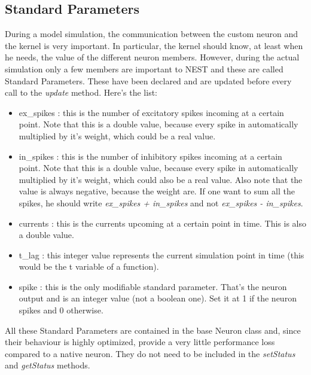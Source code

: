 \documentclass{article}
\begin{document}
\subsection{Standard Parameters}
During a model simulation, the communication between the custom neuron and the kernel is very important. In particular, the kernel should know, at least when he needs, the value of the different neuron members. However, during the actual simulation only a few members are important to NEST and these are called Standard Parameters.
These have been declared and are updated before every call to the \emph{update} method. Here's the list:
\begin{itemize}
\item ex\_spikes : this is the number of excitatory spikes incoming at a certain point. Note that this is a double value, because every spike in automatically multiplied by it's weight, which could be a real value.
\item in\_spikes : this is the number of inhibitory spikes incoming at a certain point. Note that this is a double value, because every spike in automatically multiplied by it's weight, which could also be a real value. Also note that the value is always negative, because the weight are. If one want to sum all the spikes, he should write \emph{ex\_spikes + in\_spikes} and not \emph{ex\_spikes - in\_spikes}.
\item currents : this is the currents upcoming at a certain point in time. This is also a double value.
\item t\_lag : this integer value represents the current simulation point in time (this would be the t variable of a function).
\item spike : this is the only modifiable standard parameter. That's the neuron output and is an integer value (not a boolean one). Set it at 1 if the neuron spikes and 0 otherwise.
\end{itemize}
All these Standard Parameters are contained in the base Neuron class and, since their behaviour is highly optimized, provide a very little performance loss compared to a native neuron. They do not need to be included in the \emph{setStatus} and \emph{getStatus} methods.
\end{document}
